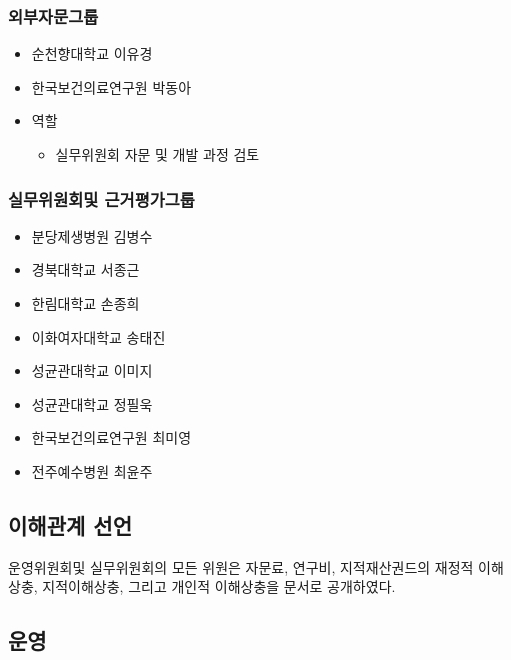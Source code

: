 \documentclass[]{book}
\providecommand{\tightlist}{%
  \setlength{\itemsep}{0pt}\setlength{\parskip}{0pt}}
\begin{document}
\hypertarget{section-33}{%
\subsubsection*{외부자문그룹}\label{section-33}}

\begin{itemize}
\item
  순천향대학교 이유경
\item
  한국보건의료연구원 박동아
\item
  역할

  \begin{itemize}
  \tightlist
  \item
    실무위원회 자문 및 개발 과정 검토
  \end{itemize}
\end{itemize}

\hypertarget{section-34}{%
\subsubsection*{실무위원회및 근거평가그룹}\label{section-34}}

\begin{itemize}
\tightlist
\item
  분당제생병원 김병수
\item
  경북대학교 서종근
\item
  한림대학교 손종희
\item
  이화여자대학교 송태진
\item
  성균관대학교 이미지
\item
  성균관대학교 정필욱
\item
  한국보건의료연구원 최미영
\item
  전주예수병원 최윤주
\end{itemize}

\hypertarget{section-35}{%
\subsection{이해관계 선언}\label{section-35}}

운영위원회및 실무위원회의 모든 위원은 자문료, 연구비, 지적재산권드의 재정적 이해상충, 지적이해상충, 그리고 개인적 이해상충을 문서로 공개하였다.

\hypertarget{section-36}{%
\subsection{운영}\label{section-36}}
\end{document}

